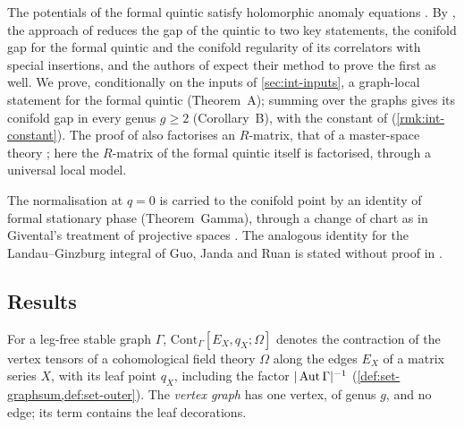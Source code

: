 The potentials of the formal quintic satisfy holomorphic anomaly equations \cite[Theorems~1 and~2, \S0.4]{LP20}. By \cite[Remark~1.9]{CGYZ26}, the approach of \cite{GJR18} reduces the gap of the quintic to two key statements, the conifold gap for the formal quintic and the conifold regularity of its correlators with special insertions, and the authors of \cite{CGYZ26} expect their method to prove the first as well. We prove, conditionally on the inputs of \cref{sec:int-inputs}, a graph-local statement for the formal quintic (Theorem~A); summing over the graphs gives its conifold gap in every genus $g\geq2$ (Corollary~B), with the constant of \cite[Conjecture~1.5]{CGYZ26} (\cref{rmk:int-constant}). The proof of \cite{CGYZ26} also factorises an $R$-matrix, that of a master-space theory \cite[Proposition~3.1]{CGYZ26}; here the $R$-matrix of the formal quintic itself is factorised, through a universal local model.

The normalisation at $q=0$ is carried to the conifold point by an identity of formal stationary phase (Theorem~Gamma), through a change of chart as in Givental's treatment of projective spaces \cite[\S10]{MR1901075}. The analogous identity for the Landau--Ginzburg integral of Guo, Janda and Ruan is stated without proof in \cite[Remark~7.2]{GJR18}.

\subsection{Results}
\label{sec:int-results}

For a leg-free stable graph $\Gamma$, $\mathrm{Cont}_\Gamma[E_X,q_X;\Omega]$ denotes the contraction of the vertex tensors of a cohomological field theory $\Omega$ along the edges $E_X$ of a matrix series $X$, with its leaf point $q_X$, including the factor $|\operatorname{Aut}\Gamma|^{-1}$ (\cref{def:set-graphsum,def:set-outer}).
The \emph{vertex graph} has one vertex, of genus $g$, and no edge; its term contains the leaf decorations.

